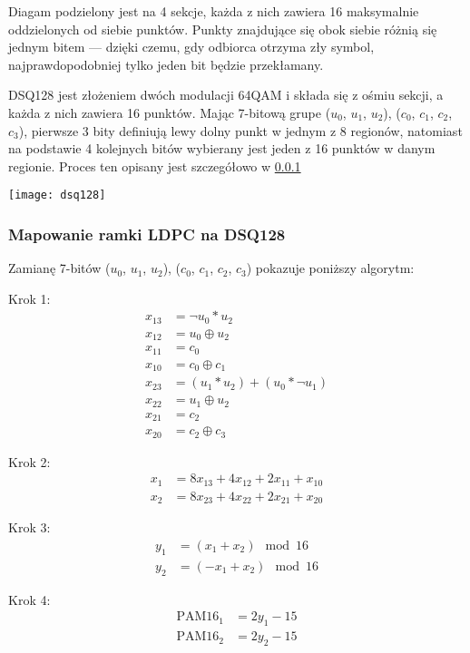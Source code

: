 Diagam podzielony jest na 4 sekcje, każda z nich zawiera 16 maksymalnie oddzielonych od siebie punktów. Punkty znajdujące się obok siebie różnią się jednym bitem --- dzięki czemu, gdy odbiorca otrzyma zły symbol, najprawdopodobniej tylko jeden bit będzie przekłamany.

DSQ128 jest złożeniem dwóch modulacji 64QAM i składa się z ośmiu sekcji, a każda z nich zawiera 16 punktów. Mając 7-bitową grupe ($u_0$, $u_1$, $u_2$), ($c_0$, $c_1$, $c_2$, $c_3$), pierwsze 3 bity definiują lewy dolny punkt w jednym z 8 regionów, natomiast na podstawie 4 kolejnych bitów wybierany jest jeden z 16 punktów w danym regionie. Proces ten opisany jest szczegółowo w \ref{mapowanie}

\texttt{[image: dsq128]}

\subsubsection{Mapowanie ramki LDPC na DSQ128}\label{mapowanie}
Zamianę 7-bitów ($u_0$, $u_1$, $u_2$), ($c_0$, $c_1$, $c_2$, $c_3$) pokazuje poniższy algorytm:

Krok 1:
\begin{align*}
    x_{13} &= \neg u_0 * u_2 \\
    x_{12} &= u_0 \oplus u_2 \\
    x_{11} &= c_0 \\
    x_{10} &= c_0 \oplus c_1 \\
    x_{23} &= (u_1 * u_2) + (u_0 * \neg u_1) \\
    x_{22} &= u_1 \oplus u_2 \\
    x_{21} &= c_2 \\
    x_{20} &= c_2 \oplus c_3
\end{align*}

Krok 2:
\begin{align*}
    x_1 &= 8x_{13} + 4x_{12} + 2x_{11} + x_{10} \\
    x_2 &= 8x_{23} + 4x_{22} + 2x_{21} + x_{20}
\end{align*}

Krok 3:
\begin{align*}
    y_1 &= (x_1 + x_2) \mod 16 \\
    y_2 &= (-x_1 + x_2) \mod 16
\end{align*}

Krok 4:
\begin{align*}
    \text{PAM16}_1 &= 2y_1 - 15 \\
    \text{PAM16}_2 &= 2y_2 - 15
\end{align*}

